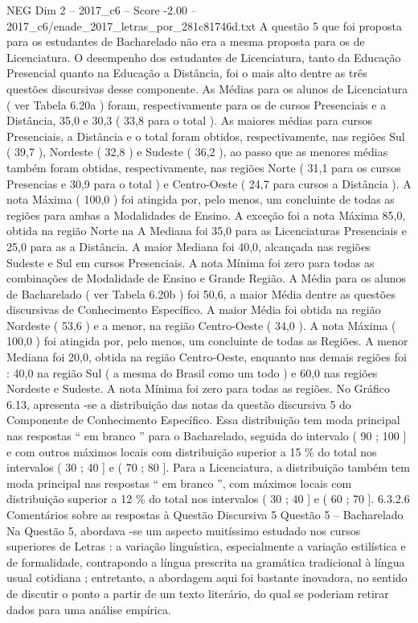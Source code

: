 \begin{textsample}{NEG Dim 2 – 2017\_c6 – Score -2.00 – 2017\_c6/enade\_2017\_letras\_por\_281c81746d.txt}
A questão 5 que foi proposta para os estudantes de Bacharelado não era a mesma proposta para os de Licenciatura.
O desempenho dos estudantes de Licenciatura, tanto da Educação Presencial quanto na Educação a Distância, foi o mais alto dentre as três questões discursivas desse componente.
As Médias para os alunos de Licenciatura ( ver Tabela 6.20a ) foram, respectivamente para os de cursos Presenciais e a Distância, 35,0 e 30,3 ( 33,8 para o total ).
As maiores médias para cursos Presenciais, a Distância e o total foram obtidos, respectivamente, nas regiões Sul ( 39,7 ), Nordeste ( 32,8 ) e Sudeste ( 36,2 ), ao passo que as menores médias também foram obtidas, respectivamente, nas regiões Norte ( 31,1 para os cursos Presencias e 30,9 para o total ) e Centro-Oeste ( 24,7 para cursos a Distância ).
A nota Máxima ( 100,0 ) foi atingida por, pelo menos, um concluinte de todas as regiões para ambas a Modalidades de Ensino.
A exceção foi a nota Máxima 85,0, obtida na região Norte na A Mediana foi 35,0 para as Licenciaturas Presenciais e 25,0 para as a Distância.
A maior Mediana foi 40,0, alcançada nas regiões Sudeste e Sul em cursos Presenciais.
A nota Mínima foi zero para todas as combinações de Modalidade de Ensino e Grande Região.
A Média para os alunos de Bacharelado ( ver Tabela 6.20b ) foi 50,6, a maior Média dentre as questões discursivas de Conhecimento Específico.
A maior Média foi obtida na região Nordeste ( 53,6 ) e a menor, na região Centro-Oeste ( 34,0 ).
A nota Máxima ( 100,0 ) foi atingida por, pelo menos, um concluinte de todas as Regiões.
A menor Mediana foi 20,0, obtida na região Centro-Oeste, enquanto nas demais regiões foi : 40,0 na região Sul ( a mesma do Brasil como um todo ) e 60,0 nas regiões Nordeste e Sudeste.
A nota Mínima foi zero para todas as regiões.
No Gráfico 6.13, apresenta -se a distribuição das notas da questão discursiva 5 do Componente de Conhecimento Específico.
Essa distribuição tem moda principal nas respostas “ em branco ” para o Bacharelado, seguida do intervalo ( 90 ; 100 ] e com outros máximos locais com distribuição superior a 15 \% do total nos intervalos ( 30 ; 40 ] e ( 70 ; 80 ].
Para a Licenciatura, a distribuição também tem moda principal nas respostas “ em branco ”, com máximos locais com distribuição superior a 12 \% do total nos intervalos ( 30 ; 40 ] e ( 60 ; 70 ]. 6.3.2.6 Comentários sobre as respostas à Questão Discursiva 5 Questão 5 – Bacharelado Na Questão 5, abordava -se um aspecto muitíssimo estudado nos cursos superiores de Letras : a variação linguística, especialmente a variação estilística e de formalidade, contrapondo a língua prescrita na gramática tradicional à língua usual cotidiana ; entretanto, a abordagem aqui foi bastante inovadora, no sentido de discutir o ponto a partir de um texto literário, do qual se poderiam retirar dados para uma análise empírica.

\end{textsample}
